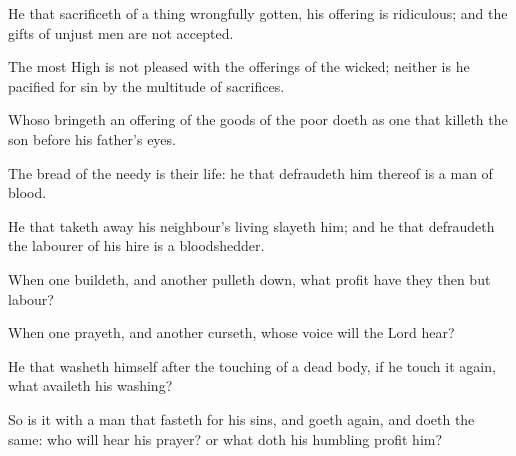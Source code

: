 {\par }{\PP {}He that sacrificeth of a thing wrongfully gotten, his offering is ridiculous; and the gifts of unjust men are not accepted.
\par }{\PP {}The most High is not pleased with the offerings of the wicked; neither is he pacified for sin by the multitude of sacrifices.
\par }{\PP {}Whoso bringeth an offering of the goods of the poor doeth as one that killeth the son before his father’s eyes.
\par }{\PP {}The bread of the needy is their life: he that defraudeth him thereof is a man of blood.
\par }{\PP {}He that taketh away his neighbour’s living slayeth him; and he that defraudeth the labourer of his hire is a bloodshedder.
\par }{\PP {}When one buildeth, and another pulleth down, what profit have they then but labour?
\par }{\PP {}When one prayeth, and another curseth, whose voice will the Lord hear?
\par }{\PP {}He that washeth himself after the touching of a dead body, if he touch it again, what availeth his washing?
\par }{\PP {}So is it with a man that fasteth for his sins, and goeth again, and doeth the same: who will hear his prayer? or what doth his humbling profit him?

}
